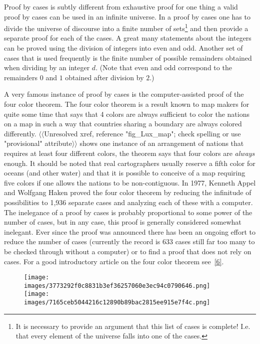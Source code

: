 \documentclass[10pt,]{book}
\theoremstyle{plain}
\theoremstyle{definition}
\theoremstyle{definition}
\numberwithin{equation}{section}
\begin{document}
    Proof by cases is subtly different from exhaustive proof \textemdash{} for one
    thing a valid proof by cases can be used in an infinite universe.
    In a proof by cases one has to divide the universe of discourse into
    a finite number of sets\footnote{It is necessary to provide an argument that 
    this list of cases is complete!  I.e. that every element of the universe
    falls into one of the cases.\label{fn-23}} and then provide a separate proof for each
    of the cases. A great many statements about the integers can be proved
    using the division of integers into even and odd. Another set of
    cases that is used frequently is the finite number of possible remainders
    obtained when dividing by an integer \(d\). (Note that even and odd correspond
    to the remainders \(0\) and \(1\) obtained after division by \(2\).)
\par

    A very famous instance of proof by cases is the computer-assisted proof
    of the
    four color theorem. The four color theorem is a result known to
    map makers for quite some time that says that 4 colors are always sufficient
    to color the nations on a map in such a way that countries sharing a boundary
    are always colored differently. {$\langle\langle$Unresolved xref, reference "fig\_Lux\_map"; check spelling or use "provisional" attribute$\rangle\rangle$} shows one instance
    of an arrangement of nations that requires at least four different colors,
    the theorem says that four colors are \emph{always} enough. It should be noted
    that real cartographers usually reserve a fifth color for oceans (and other
    water) and that it is possible to conceive of a map requiring five colors if
    one allows the nations to be non-contiguous. In 1977,
     Kenneth Appel and
    Wolfgang Haken proved the four color
    theorem by reducing the infinitude of possibilities to
    1,936 separate cases and analyzing each of these with a computer.
    The inelegance of a proof by cases is probably proportional to some power of
    the number of cases, but in any case, this proof is generally considered
    somewhat inelegant. Ever since the proof was announced there has been an
    ongoing effort to reduce the number of cases (currently the record is 633
    cases \textemdash{} still far too many to be checked through without a computer) or to
    find a proof that does not rely on cases. For a good introductory article on
    the four color theorem see~\hyperlink{wiki-4color}{[6]}.
\leavevmode%
\begin{figure}
\centering
\texttt{[image: images/3773292f0c8831b3ef36257060e3ec94c0790646.png]}
\texttt{[image: images/7165ceb5044216c12890b89bac2815ee915e7f4c.png]}
\end{figure}
\par
\end{document}
